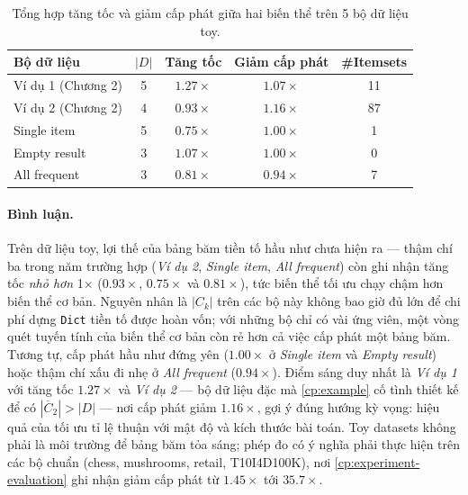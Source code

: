 \begin{table}[h!]
    \centering
    \caption{Tổng hợp tăng tốc và giảm cấp phát giữa hai biến thể trên 5 bộ dữ liệu toy.}
    \label{tab:bench-opt-toy}
    \begin{tabular}{l|c|c|c|c}
        \hline
        \textbf{Bộ dữ liệu} & \textbf{$|D|$} & \textbf{Tăng tốc} & \textbf{Giảm cấp phát} & \textbf{\#Itemsets} \\ \hline
        Ví dụ 1 (Chương 2) & 5 & $1.27\times$ & $1.07\times$ & 11 \\
        Ví dụ 2 (Chương 2) & 4 & $0.93\times$ & $1.16\times$ & 87 \\
        Single item        & 5 & $0.75\times$ & $1.00\times$ & 1  \\
        Empty result       & 3 & $1.07\times$ & $1.00\times$ & 0  \\
        All frequent       & 3 & $0.81\times$ & $0.94\times$ & 7  \\
        \hline
    \end{tabular}
\end{table}

\paragraph{Bình luận.} Trên dữ liệu toy, lợi thế của bảng băm tiền tố hầu như chưa hiện ra --- thậm chí ba trong năm trường hợp (\emph{Ví dụ 2}, \emph{Single item}, \emph{All frequent}) còn ghi nhận tăng tốc \emph{nhỏ hơn} 1$\times$ ($0.93\times$, $0.75\times$ và $0.81\times$), tức biến thể tối ưu chạy chậm hơn biến thể cơ bản. Nguyên nhân là $|C_k|$ trên các bộ này không bao giờ đủ lớn để chi phí dựng \texttt{Dict} tiền tố được hoàn vốn; với những bộ chỉ có vài ứng viên, một vòng quét tuyến tính của biến thể cơ bản còn rẻ hơn cả việc cấp phát một bảng băm. Tương tự, cấp phát hầu như đứng yên ($1.00\times$ ở \emph{Single item} và \emph{Empty result}) hoặc thậm chí xấu đi nhẹ ở \emph{All frequent} ($0.94\times$). Điểm sáng duy nhất là \emph{Ví dụ 1} với tăng tốc $1.27\times$ và \emph{Ví dụ 2} --- bộ dữ liệu đặc mà \autoref{cp:example} cố tình thiết kế để có $|\overline{C}_2| > |D|$ --- nơi cấp phát giảm $1.16\times$, gợi ý đúng hướng kỳ vọng: hiệu quả của tối ưu tỉ lệ thuận với mật độ và kích thước bài toán. Toy datasets không phải là môi trường để bảng băm tỏa sáng; phép đo có ý nghĩa phải thực hiện trên các bộ chuẩn (chess, mushrooms, retail, T10I4D100K), nơi \autoref{cp:experiment-evaluation} ghi nhận giảm cấp phát từ $1.45\times$ tới $35.7\times$.

